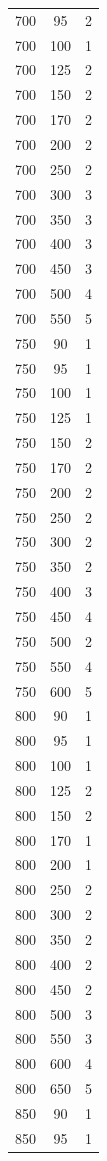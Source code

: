 \begin{longtable}{c c c}
700 & 95 & 2 \\
700 & 100 & 1 \\
700 & 125 & 2 \\
700 & 150 & 2 \\
700 & 170 & 2 \\
700 & 200 & 2 \\
700 & 250 & 2 \\
700 & 300 & 3 \\
700 & 350 & 3 \\
700 & 400 & 3 \\
700 & 450 & 3 \\
700 & 500 & 4 \\
700 & 550 & 5 \\
750 & 90 & 1 \\
750 & 95 & 1 \\
750 & 100 & 1 \\
750 & 125 & 1 \\
750 & 150 & 2 \\
750 & 170 & 2 \\
750 & 200 & 2 \\
750 & 250 & 2 \\
750 & 300 & 2 \\
750 & 350 & 2 \\
750 & 400 & 3 \\
750 & 450 & 4 \\
750 & 500 & 2 \\
750 & 550 & 4 \\
750 & 600 & 5 \\
800 & 90 & 1 \\
800 & 95 & 1 \\
800 & 100 & 1 \\
800 & 125 & 2 \\
800 & 150 & 2 \\
800 & 170 & 1 \\
800 & 200 & 1 \\
800 & 250 & 2 \\
800 & 300 & 2 \\
800 & 350 & 2 \\
800 & 400 & 2 \\
800 & 450 & 2 \\
800 & 500 & 3 \\
800 & 550 & 3 \\
800 & 600 & 4 \\
800 & 650 & 5 \\
850 & 90 & 1 \\
850 & 95 & 1 \\

\end{longtable}
